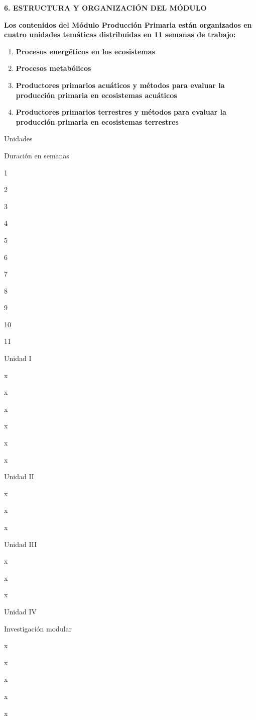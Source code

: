 \documentclass[
]{article}
\begin{document}
\textbf{6. ESTRUCTURA Y ORGANIZACIÓN DEL MÓDULO}

\textbf{Los contenidos del Módulo Producción Primaria están organizados
en cuatro unidades temáticas distribuidas en 11 semanas de trabajo:}

\begin{enumerate}
\def\labelenumi{\Roman{enumi}.}
\item
  \textbf{Procesos energéticos en los ecosistemas}
\item
  \textbf{Procesos metabólicos}
\item
  \textbf{Productores primarios acuáticos y métodos para evaluar la
  producción primaria en ecosistemas acuáticos}
\item
  \textbf{Productores primarios terrestres y métodos para evaluar la
  producción primaria en ecosistemas terrestres}
\end{enumerate}

\textbf{\hfill\break
}

Unidades

Duración en semanas

1

2

3

4

5

6

7

8

9

10

11

Unidad I

x

x

x

x

x

x

Unidad II

x

x

x

Unidad III

x

x

x

Unidad IV

Investigación modular

x

x

x

x

x
\end{document}
